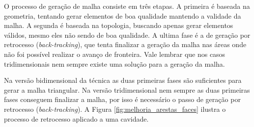 O processo de geração de malha consiste em três etapas. A primeira é baseada na geometria, tentando gerar elementos de boa qualidade mantendo a validade da malha. A segunda é baseada na topologia, buscando apenas gerar elementos válidos, mesmo eles não sendo de boa qualidade. A ultima fase é a de geração por retrocesso (\textit{back-tracking}), que tenta finalizar a geração da malha nas áreas onde não foi possível realizar o avanço de fronteira. Vale lembrar que nos casos tridimensionais nem sempre existe uma solução para a geração da malha.

Na versão bidimensional da técnica as duas primeiras fases são suficientes para gerar a malha triangular. Na versão tridimensional nem sempre as duas primeiras fases conseguem finalizar a malha, por isso é necessário o passo de geração por retrocesso (\textit{back-tracking}). A Figura \ref{fig:melhoria_arestas_faces} ilustra o processo de retrocesso aplicado a uma cavidade.



